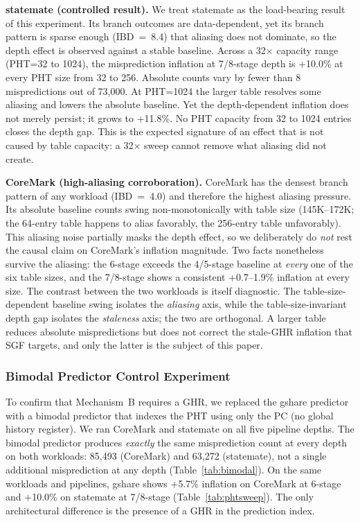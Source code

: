 \documentclass[acmsmall,nonacm,screen]{acmart}
\begin{document}
\textbf{statemate (controlled result).}
We treat statemate as the load-bearing result of this experiment. Its branch outcomes are data-dependent, yet its branch pattern is sparse enough (IBD~=~8.4) that aliasing does not dominate, so the depth effect is observed against a stable baseline.
Across a 32$\times$ capacity range (PHT=32 to 1024), the misprediction inflation at 7/8-stage depth is +10.0\% at every PHT size from 32 to 256. Absolute counts vary by fewer than 8 mispredictions out of 73{,}000.
At PHT=1024 the larger table resolves some aliasing and lowers the absolute baseline. Yet the depth-dependent inflation does not merely persist; it grows to +11.8\%.
No PHT capacity from 32 to 1024 entries closes the depth gap. This is the expected signature of an effect that is not caused by table capacity: a 32$\times$ sweep cannot remove what aliasing did not create.

\textbf{CoreMark (high-aliasing corroboration).}
CoreMark has the densest branch pattern of any workload (IBD~=~4.0) and therefore the highest aliasing pressure. Its absolute baseline counts swing non-monotonically with table size (145K--172K; the 64-entry table happens to alias favorably, the 256-entry table unfavorably).
This aliasing noise partially masks the depth effect, so we deliberately do \emph{not} rest the causal claim on CoreMark's inflation magnitude.
Two facts nonetheless survive the aliasing: the 6-stage exceeds the 4/5-stage baseline at \emph{every} one of the six table sizes, and the 7/8-stage shows a consistent +0.7--1.9\% inflation at every size.
The contrast between the two workloads is itself diagnostic.
The table-size-dependent baseline swing isolates the \emph{aliasing} axis, while the table-size-invariant depth gap isolates the \emph{staleness} axis; the two are orthogonal.
A larger table reduces absolute mispredictions but does not correct the stale-GHR inflation that SGF targets, and only the latter is the subject of this paper.

\subsubsection{Bimodal Predictor Control Experiment}
\label{sec:bimodal}

To confirm that Mechanism~B requires a GHR, we replaced the gshare predictor with a bimodal predictor that indexes the PHT using only the PC (no global history register). We ran CoreMark and statemate on all five pipeline depths.
The bimodal predictor produces \emph{exactly} the same misprediction count at every depth on both workloads: 85{,}493 (CoreMark) and 63{,}272 (statemate), not a single additional misprediction at any depth (Table~\ref{tab:bimodal}). On the same workloads and pipelines, gshare shows $+$5.7\% inflation on CoreMark at 6-stage and $+$10.0\% on statemate at 7/8-stage (Table~\ref{tab:phtsweep}).
The only architectural difference is the presence of a GHR in the prediction index.
\end{document}
